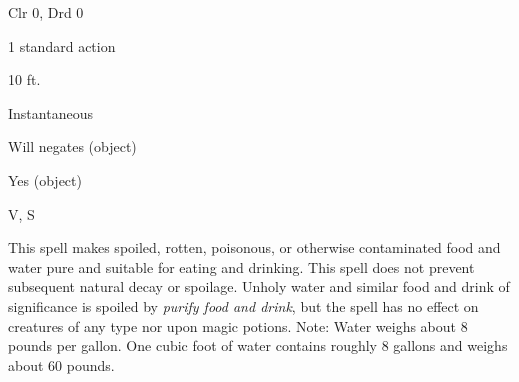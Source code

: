 
\begin{description*}
\item[Level:] Clr 0, Drd 0
\item[Casting Time:] 1 standard action
\item[Range:] 10 ft.
\item[Duration:] Instantaneous
\item[Saving Throw:] Will negates (object)
\item[Spell Resistance:] Yes (object)
\item[Components:] V, S
\end{description*}

This spell makes spoiled, rotten, poisonous, or otherwise contaminated food and
water pure and suitable for eating and drinking. This spell does not prevent subsequent
natural decay or spoilage. Unholy water and similar food and drink of significance
is spoiled by \textit{purify food and drink}, but the spell has no effect on creatures
of any type nor upon magic potions.
Note: Water weighs about 8 pounds per gallon. One cubic foot of water
contains roughly 8 gallons and weighs about 60 pounds.